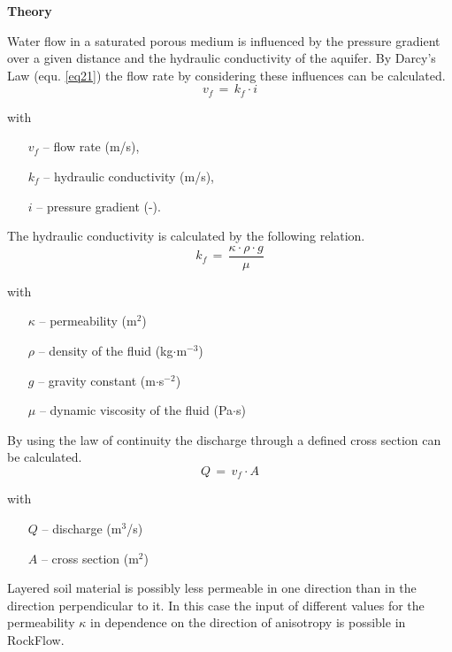 
\textbf{Theory}

Water flow in a saturated porous medium is influenced by the pressure gradient over a given distance and the hydraulic conductivity of the aquifer. By Darcy's Law (equ. \ref{eq21}) the flow rate by considering these influences can be calculated.
\begin{equation}
v_f\,=\,k_f\cdot i
\label{eq21}
\end{equation}
{\small
with
\begin{itemize}
\item[$v_f$] -- flow rate (m/s),
\item[$k_f$] -- hydraulic conductivity (m/s),
\item[$i$] -- pressure gradient (-).
\end{itemize}
}

The hydraulic conductivity is calculated by the following relation.
\begin{equation}
k_f\,=\,\frac{\kappa\cdot\rho\cdot g}{\mu}
\label{eq22}
\end{equation}
{\small
with
\begin{itemize}
\item[$\kappa$] -- permeability (m$^2$)
\item[$\rho$] -- density of the fluid (kg$\cdot$m$^{-3}$)
\item[$g$] -- gravity constant (m$\cdot$s$^{-2}$)
\item[$\mu$] -- dynamic viscosity of the fluid (Pa$\cdot$s)
\end{itemize}
}

By using the law of continuity the discharge through a defined cross section can be calculated.
\begin{equation}
Q\,=\,v_f\cdot A
\label{eq23}
\end{equation}
{\small
with
\begin{itemize}
\item[$Q$] -- discharge (m$^3$/s)
\item[$A$] -- cross section (m$^2$)
\end{itemize}
}

Layered soil material is possibly less permeable in one direction than in the direction perpendicular to it. In this case the input of different values for the permeability $\kappa$ in dependence on the direction of anisotropy is possible in RockFlow.
